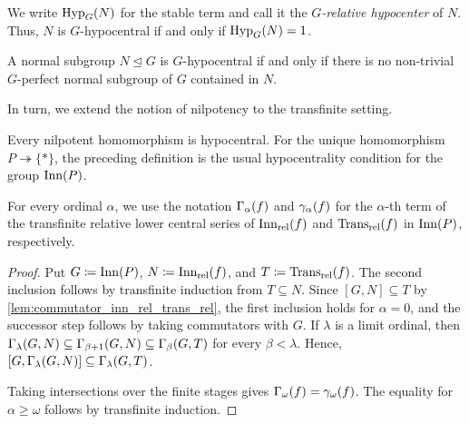 We write $\operatorname{Hyp}_{G}(N)$ for the stable term and call it the \emph{$G$-relative hypocenter} of $N$. Thus, $N$ is $G$-hypocentral if and only if $\operatorname{Hyp}_{G}(N)=1$.

\begin{cor}
\label{corollary:relative_hypocentral_iff_no_non-trivial_relative_perfect}
    A normal subgroup $N\trianglelefteq G$ is $G$-hypocentral if and only if there is no non-trivial $G$-perfect normal subgroup of $G$ contained in $N$.
\end{cor}

In turn, we extend the notion of nilpotency to the transfinite setting.


Every nilpotent homomorphism is hypocentral. For the unique homomorphism $P\twoheadrightarrow\{*\}$, the preceding definition is the usual hypocentrality condition for the group $\operatorname{Inn}(P)$.

For every ordinal $\alpha$, we use the notation $\Gamma_{\alpha}(f)$ and $\gamma_{\alpha}(f)$ for the $\alpha$-th term of the transfinite relative lower central series of $\operatorname{Inn_{rel}}(f)$ and $\operatorname{Trans_{rel}}(f)$ in $\operatorname{Inn}(P)$, respectively.


\begin{proof}
Put $G\coloneqq\operatorname{Inn}(P)$, $N\coloneqq\operatorname{Inn_{rel}}(f)$, and $T\coloneqq\operatorname{Trans_{rel}}(f)$. The second inclusion follows by transfinite induction from $T\subseteq N$. Since $[G,N]\subseteq T$ by \cref{lem:commutator_inn_rel_trans_rel}, the first inclusion holds for $\alpha=0$, and the successor step follows by taking commutators with $G$. If $\lambda$ is a limit ordinal, then $\Gamma_\lambda(G,N)\subseteq\Gamma_{\beta+1}(G,N) \subseteq\Gamma_\beta(G,T)$ for every $\beta<\lambda$. Hence, $[G,\Gamma_\lambda(G,N)]\subseteq\Gamma_\lambda(G,T)$.

Taking intersections over the finite stages gives $\Gamma_{\omega}(f)=\gamma_{\omega}(f)$. The equality for $\alpha\geq\omega$ follows by transfinite induction.
\end{proof}


